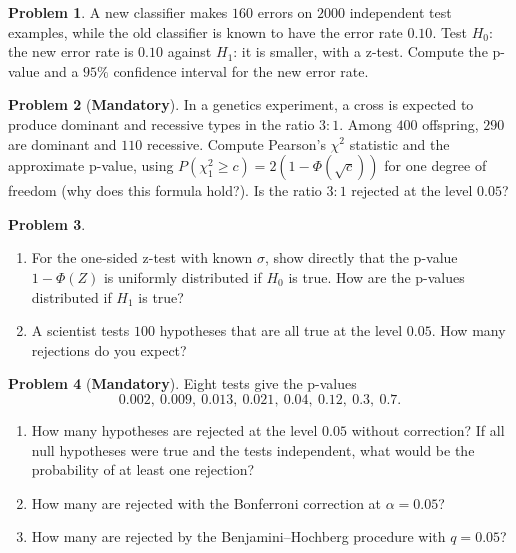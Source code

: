 \documentclass[11pt]{article}
\theoremstyle{definition}
\newtheorem{problem}{Problem}[section]
\newcommand{\mandatory}{\textcolor{red!70!black}{\textbf{Mandatory}}}
\begin{document}
\begin{problem}\label{pr:error-test}
    A new classifier makes $160$ errors on $2000$ independent test examples, while the old classifier is known to have the error rate $0.10$. Test $H_0$: the new error rate is $0.10$ against $H_1$: it is smaller, with a z-test. Compute the p-value and a $95\%$ confidence interval for the new error rate.
\end{problem}

\begin{problem}[\mandatory]\label{pr:chi-square}
    In a genetics experiment, a cross is expected to produce dominant and recessive types in the ratio $3 : 1$. Among $400$ offspring, $290$ are dominant and $110$ recessive. Compute Pearson's $\chi^2$ statistic and the approximate p-value, using $P(\chi^2_1 \geq c) = 2(1 - \Phi(\sqrt{c}))$ for one degree of freedom (why does this formula hold?). Is the ratio $3 : 1$ rejected at the level $0.05$?
\end{problem}

\begin{problem}\label{pr:pvalue-dist}
    \begin{enumerate}[label=(\alph*)]
        \item For the one-sided z-test with known $\sigma$, show directly that the p-value $1 - \Phi(Z)$ is uniformly distributed if $H_0$ is true. How are the p-values distributed if $H_1$ is true?
        \item A scientist tests $100$ hypotheses that are all true at the level $0.05$. How many rejections do you expect?
    \end{enumerate}
\end{problem}

\begin{problem}[\mandatory]\label{pr:multiple}
    Eight tests give the p-values
    \[0.002, \ 0.009, \ 0.013, \ 0.021, \ 0.04, \ 0.12, \ 0.3, \ 0.7.\]
    \begin{enumerate}[label=(\alph*)]
        \item How many hypotheses are rejected at the level $0.05$ without correction? If all null hypotheses were true and the tests independent, what would be the probability of at least one rejection?
        \item How many are rejected with the Bonferroni correction at $\alpha = 0.05$?
        \item How many are rejected by the Benjamini--Hochberg procedure with $q = 0.05$?
    \end{enumerate}
\end{problem}
\end{document}
